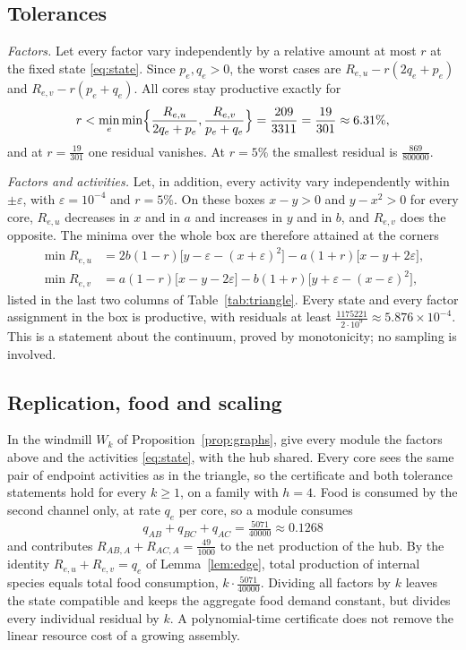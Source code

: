 \documentclass[11pt,a4paper]{article}
\theoremstyle{plain}
\theoremstyle{definition}
\theoremstyle{remark}
\begin{document}
\subsection{Tolerances}\label{sec:box}
\emph{Factors.} Let every factor vary independently by a relative amount at most $r$ at the fixed state \eqref{eq:state}. Since $p_e,q_e>0$, the worst cases are $R_{e,u}-r(2q_e+p_e)$ and $R_{e,v}-r(p_e+q_e)$. All cores stay productive exactly for
\[
   r<\min_e\min\Bigl\{\frac{R_{e,u}}{2q_e+p_e},\frac{R_{e,v}}{p_e+q_e}\Bigr\}=\frac{209}{3311}=\frac{19}{301}\approx6.31\%,
\]
and at $r=\tfrac{19}{301}$ one residual vanishes. At $r=5\%$ the smallest residual is $\tfrac{869}{800000}$.

\emph{Factors and activities.} Let, in addition, every activity vary independently within $\pm\varepsilon$, with $\varepsilon=10^{-4}$ and $r=5\%$. On these boxes $x-y>0$ and $y-x^2>0$ for every core, $R_{e,u}$ decreases in $x$ and in $a$ and increases in $y$ and in $b$, and $R_{e,v}$ does the opposite. The minima over the whole box are therefore attained at the corners
\begin{align*}
 \min R_{e,u}&=2b(1-r)\bigl[y-\varepsilon-(x+\varepsilon)^2\bigr]-a(1+r)\bigl[x-y+2\varepsilon\bigr],\\
 \min R_{e,v}&=a(1-r)\bigl[x-y-2\varepsilon\bigr]-b(1+r)\bigl[y+\varepsilon-(x-\varepsilon)^2\bigr],
\end{align*}
listed in the last two columns of Table~\ref{tab:triangle}. Every state and every factor assignment in the box is productive, with residuals at least $\tfrac{1175221}{2\cdot10^{9}}\approx5.876\times10^{-4}$. This is a statement about the continuum, proved by monotonicity; no sampling is involved.

\subsection{Replication, food and scaling}\label{sec:windmill}
In the windmill $W_k$ of Proposition~\ref{prop:graphs}, give every module the factors above and the activities \eqref{eq:state}, with the hub shared. Every core sees the same pair of endpoint activities as in the triangle, so the certificate and both tolerance statements hold for every $k\ge1$, on a family with $h=4$. Food is consumed by the second channel only, at rate $q_e$ per core, so a module consumes
\[
  q_{AB}+q_{BC}+q_{AC}=\tfrac{5071}{40000}\approx0.1268
\]
and contributes $R_{AB,A}+R_{AC,A}=\tfrac{49}{1000}$ to the net production of the hub. By the identity $R_{e,u}+R_{e,v}=q_e$ of Lemma~\ref{lem:edge}, total production of internal species equals total food consumption, $k\cdot\tfrac{5071}{40000}$. Dividing all factors by $k$ leaves the state compatible and keeps the aggregate food demand constant, but divides every individual residual by $k$. A polynomial-time certificate does not remove the linear resource cost of a growing assembly.
\end{document}
